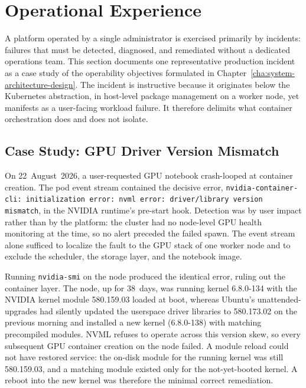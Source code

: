 \section{Operational Experience}
\label{sec:operations}

A platform operated by a single administrator is exercised primarily by incidents: failures that must be detected, diagnosed, and remediated without a dedicated operations team. This section documents one representative production incident as a case study of the operability objectives formulated in Chapter~\ref{cha:system-architecture-design}. The incident is instructive because it originates below the Kubernetes abstraction, in host-level package management on a worker node, yet manifests as a user-facing workload failure. It therefore delimits what container orchestration does and does not isolate.

\subsection{Case Study: GPU Driver Version Mismatch}
\label{sec:driver-mismatch}

On 22~August~2026, a user-requested GPU notebook crash-looped at container creation. The pod event stream contained the decisive error, \texttt{nvidia-container-cli: initialization error: nvml error: driver/library version mismatch}, in the NVIDIA runtime's pre-start hook. Detection was by user impact rather than by the platform: the cluster had no node-level GPU health monitoring at the time, so no alert preceded the failed spawn. The event stream alone sufficed to localize the fault to the GPU stack of one worker node and to exclude the scheduler, the storage layer, and the notebook image.

Running \texttt{nvidia-smi} on the node produced the identical error, ruling out the container layer. The node, up for 38~days, was running kernel 6.8.0-134 with the NVIDIA kernel module 580.159.03 loaded at boot, whereas Ubuntu's unattended-upgrades had silently updated the userspace driver libraries to 580.173.02 on the previous morning and installed a new kernel (6.8.0-138) with matching precompiled modules. NVML refuses to operate across this version skew, so every subsequent GPU container creation on the node failed. A module reload could not have restored service: the on-disk module for the running kernel was still 580.159.03, and a matching module existed only for the not-yet-booted kernel. A reboot into the new kernel was therefore the minimal correct remediation.

